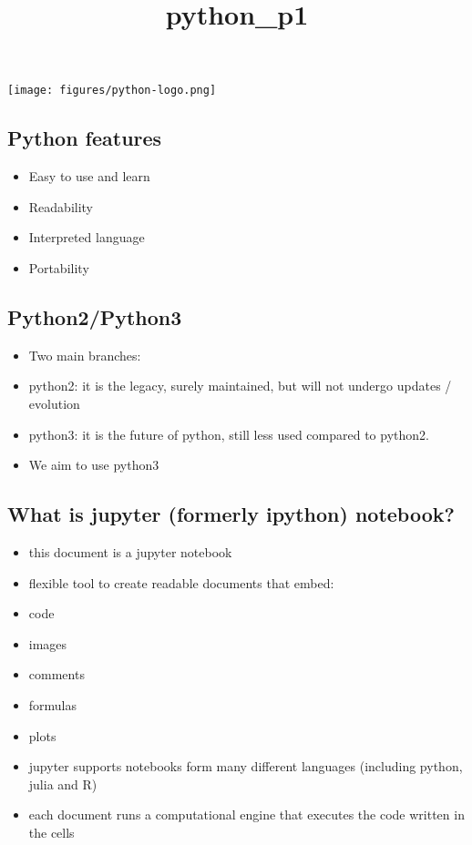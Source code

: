\documentclass[11pt]{article}
\title{python\_p1}
\providecommand{\tightlist}{%
      \setlength{\itemsep}{0pt}\setlength{\parskip}{0pt}}
\begin{document}
    
    \maketitle
    
    

    
    \texttt{[image: figures/python-logo.png]}

\hypertarget{python-features}{%
\subsection{Python features}\label{python-features}}

\begin{itemize}
\tightlist
\item
  Easy to use and learn
\item
  Readability
\item
  Interpreted language
\item
  Portability
\end{itemize}

    \hypertarget{python2python3}{%
\subsection{Python2/Python3}\label{python2python3}}

\begin{itemize}
\tightlist
\item
  Two main branches:
\item
  python2: it is the legacy, surely maintained, but will not undergo
  updates / evolution
\item
  python3: it is the future of python, still less used compared to
  python2.
\item
  We aim to use python3
\end{itemize}

    \hypertarget{what-is-jupyter-formerly-ipython-notebook}{%
\subsection{What is jupyter (formerly ipython)
notebook?}\label{what-is-jupyter-formerly-ipython-notebook}}

\begin{itemize}
\tightlist
\item
  this document is a jupyter notebook
\item
  flexible tool to create readable documents that embed:
\item
  code
\item
  images
\item
  comments
\item
  formulas
\item
  plots
\item
  jupyter supports notebooks form many different languages (including
  python, julia and R)
\item
  each document runs a computational engine that executes the code
  written in the cells
\end{itemize}
\end{document}
